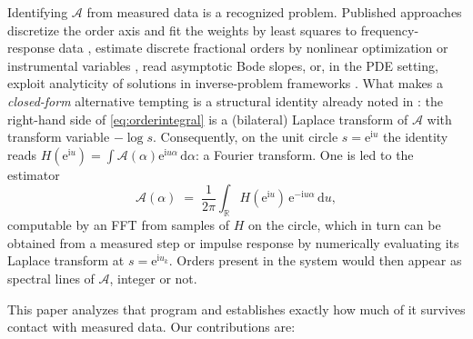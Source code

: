 \documentclass[11pt, a4paper]{article}
\theoremstyle{definition}
\theoremstyle{remark}
\newcommand{\R}{\mathbb{R}}
\newcommand{\dd}{\,\mathrm{d}}
\newcommand{\ii}{\mathrm{i}}
\newcommand{\ee}{\mathrm{e}}
\begin{document}
Identifying $\mathcal{A}$ from measured data is a recognized problem.
Published approaches discretize the order axis and fit the weights by least
squares to frequency-response data
\cite{HartleyLorenzo2003,NazarianHaeri2010,DuanLi2021}, estimate discrete
fractional orders by nonlinear optimization or instrumental variables
\cite{VictorMalti2013,VictorMalti2022}, read asymptotic Bode slopes, or, in
the PDE setting, exploit analyticity of solutions in inverse-problem
frameworks \cite{LiuSunYamamoto2021}. What makes a \emph{closed-form}
alternative tempting is a structural identity already noted in
\cite{HartleyLorenzo1999}: the right-hand side of \eqref{eq:orderintegral}
is a (bilateral) Laplace transform of $\mathcal{A}$ with transform variable
$-\log s$. Consequently, on the unit circle $s=\ee^{\ii u}$ the identity
reads $H(\ee^{\ii u})=\int\mathcal{A}(\alpha)\ee^{\ii u\alpha}\dd\alpha$: a
Fourier transform. One is led to the estimator
\begin{equation}\label{eq:naiveinversion}
\mathcal{A}(\alpha) \;=\; \frac{1}{2\pi}\int_{\R}
H(\ee^{\ii u}) \, \ee^{-\ii u\alpha}\dd u ,
\end{equation}
computable by an FFT from samples of $H$ on the circle, which in turn can be
obtained from a measured step or impulse response by numerically evaluating
its Laplace transform at $s=\ee^{\ii u_k}$. Orders present in the system
would then appear as spectral lines of $\mathcal{A}$, integer or not.

This paper analyzes that program and establishes exactly how much of it
survives contact with measured data. Our contributions are:
\end{document}
